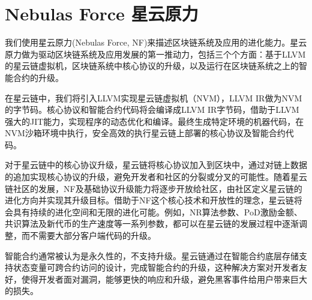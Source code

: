 \section{Nebulas Force 星云原力}
\label{sec:nebulasforce}

我们使用星云原力(Nebulas Force, NF)来描述区块链系统及应用的进化能力。星云原力做为驱动区块链系统及应用发展的第一推动力，包括三个个方面：基于LLVM的星云链虚拟机，区块链系统中核心协议的升级，以及运行在区块链系统之上的智能合约的升级。

在星云链中，我们将引入LLVM实现星云链虚拟机（NVM），LLVM IR做为NVM的字节码。核心协议和智能合约代码将会编译成LLVM IR字节码，借助于LLVM强大的JIT能力，实现程序的动态优化和编译。最终生成特定环境的机器代码，在NVM沙箱环境中执行，安全高效的执行星云链上部署的核心协议及智能合约代码。

对于星云链中的核心协议升级，星云链将核心协议加入到区块中，通过对链上数据的追加实现核心协议的升级，避免开发者和社区的分裂或分叉的可能性。随着星云链社区的发展，NF及基础协议升级能力将逐步开放给社区，由社区定义星云链的进化方向并实现其升级目标。借助于NF这个核心技术和开放性的理念，星云链将会具有持续的进化空间和无限的进化可能。例如，NR算法参数、PoD激励金额、共识算法及新代币的生产速度等一系列参数，都可以在星云链的发展过程中逐渐调整，而不需要大部分客户端代码的升级。

智能合约通常被认为是永久性的，不支持升级。星云链通过在智能合约底层存储支持状态变量可跨合约访问的设计，完成智能合约的升级，这种解决方案对开发者友好，使得开发者面对漏洞，能够更快的响应和升级，避免黑客事件给用户带来巨大的损失。




